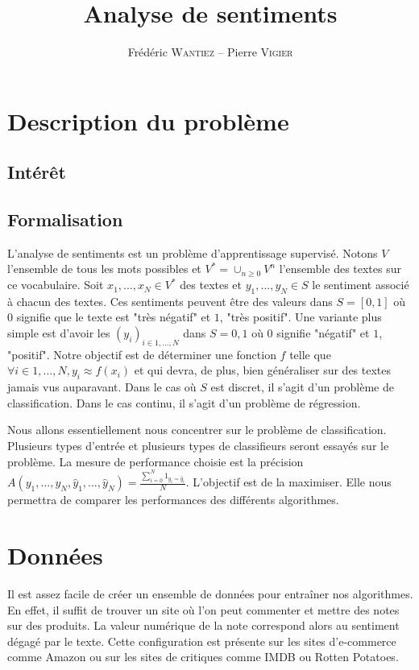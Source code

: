 \documentclass{article}
\title{Analyse de sentiments}
\author{Frédéric \textsc{Wantiez} -- Pierre \textsc{Vigier}}
\begin{document}
\maketitle

\section{Description du problème}

\subsection{Intérêt}

\subsection{Formalisation}

L'analyse de sentiments est un problème d'apprentissage supervisé. Notons $V$ l'ensemble de tous les mots possibles et $V^{*}=\cup_{n \geq 0}{V^{n}}$ l'ensemble des textes sur ce vocabulaire. Soit $x_{1}, ..., x_{N} \in V^{*}$ des textes et $y_{1}, ..., y_{N} \in S$ le sentiment associé à chacun des textes. Ces sentiments peuvent être des valeurs dans $S=[0, 1]$ où $0$ signifie que le texte est "très négatif" et $1$, "très positif". Une variante plus simple est d'avoir les $(y_{i})_{i \in {1, ..., N}}$ dans $S={0, 1}$ où 0 signifie "négatif" et $1$, "positif". Notre objectif est de déterminer une fonction $f$ telle que $\forall i \in {1, ..., N}, y_{i} \approx f(x_{i})$ et qui devra, de plus, bien généraliser sur des textes jamais vus auparavant. Dans le cas où $S$ est discret, il s'agit d'un problème de classification. Dans le cas continu, il s'agit d'un problème de régression.

Nous allons essentiellement nous concentrer sur le problème de classification. Plusieurs types d'entrée et plusieurs types de classifieurs seront essayés sur le problème. La mesure de performance choisie est la précision $A(y_{1}, ..., y_{N}, \hat{y}_{1}, ..., \hat{y}_{N}) = \frac{\sum_{i=0}^{N}{1_{y_{i}=\hat{y}_{i}}}}{N}$. L'objectif est de la maximiser. Elle nous permettra de comparer les performances des différents algorithmes.

\section{Données}

Il est assez facile de créer un ensemble de données pour entraîner nos algorithmes. En effet, il suffit de trouver un site où l'on peut commenter et mettre des notes sur des produits. La valeur numérique de la note correspond alors au sentiment dégagé par le texte. Cette configuration est présente sur les sites d'e-commerce comme Amazon ou sur les sites de critiques comme IMDB ou Rotten Potatoes.
\end{document}
